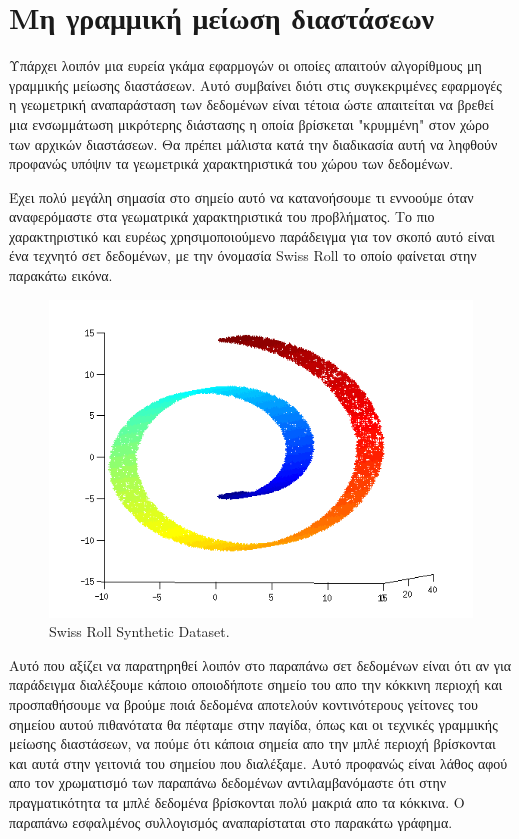 \section{Μη γραμμική μείωση διαστάσεων}
\par
Υπάρχει λοιπόν μια ευρεία γκάμα εφαρμογών οι οποίες απαιτούν αλγορίθμους μη γραμμικής μείωσης διαστάσεων. Αυτό συμβαίνει διότι στις συγκεκριμένες εφαρμογές η γεωμετρική αναπαράσταση των δεδομένων είναι τέτοια ώστε απαιτείται να βρεθεί μια ενσωμμάτωση μικρότερης διάστασης η οποία βρίσκεται "κρυμμένη" στον χώρο των αρχικών διαστάσεων. Θα πρέπει μάλιστα κατά την διαδικασία αυτή να ληφθούν προφανώς υπόψιν τα γεωμετρικά χαρακτηριστικά του χώρου των δεδομένων. 
\par
Έχει πολύ μεγάλη σημασία στο σημείο αυτό να κατανοήσουμε τι εννοούμε όταν αναφερόμαστε στα γεωματρικά χαρακτηριστικά του προβλήματος. Το πιο χαρακτηριστικό και ευρέως χρησιμοποιούμενο παράδειγμα για τον σκοπό αυτό είναι ένα τεχνητό σετ δεδομένων, με την όνομασία \textlatin{Swiss Roll} το οποίο φαίνεται στην παρακάτω εικόνα. \\
\vspace{1.0cm}
\begin{figure}[h]
\centering
\includegraphics[scale=0.8]{figs/2.png}
\newline
\caption{ \textlatin{Swiss Roll Synthetic Dataset}.} 
\end{figure}
\vspace{1.0cm}
\par
Αυτό που αξίζει να παρατηρηθεί λοιπόν στο παραπάνω σετ δεδομένων είναι ότι αν για παράδειγμα διαλέξουμε κάποιο οποιοδήποτε σημείο του απο την κόκκινη περιοχή και προσπαθήσουμε να βρούμε ποιά δεδομένα αποτελούν κοντινότερους γείτονες του σημείου αυτού πιθανότατα θα πέφταμε στην παγίδα, όπως και οι τεχνικές γραμμικής μείωσης διαστάσεων, να πούμε ότι κάποια σημεία απο την μπλέ περιοχή βρίσκονται και αυτά στην γειτονιά του σημείου που διαλέξαμε. Αυτό προφανώς είναι λάθος αφού απο τον χρωματισμό των παραπάνω δεδομένων αντιλαμβανόμαστε ότι στην πραγματικότητα τα μπλέ δεδομένα βρίσκονται πολύ μακριά απο τα κόκκινα. Ο παραπάνω εσφαλμένος συλλογισμός αναπαρίσταται στο παρακάτω γράφημα.
